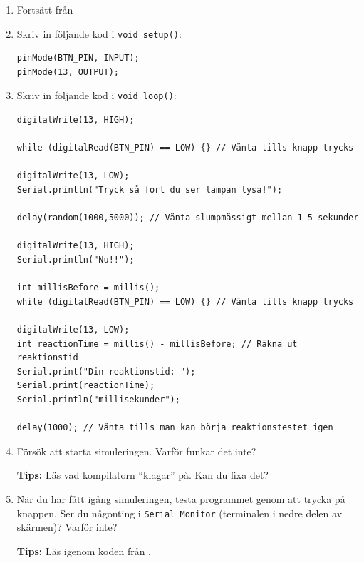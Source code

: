 \documentclass[11pt]{article}
\begin{document}
\begin{enumerate}
      \item
            Fortsätt från 
      \item Skriv in följande kod i \texttt{void setup()}:
            \begin{lstlisting}
pinMode(BTN_PIN, INPUT);
pinMode(13, OUTPUT);
            \end{lstlisting}
      \item Skriv in följande kod i \texttt{void loop()}:
            \begin{lstlisting}
digitalWrite(13, HIGH);

while (digitalRead(BTN_PIN) == LOW) {} // Vänta tills knapp trycks

digitalWrite(13, LOW);
Serial.println("Tryck så fort du ser lampan lysa!");

delay(random(1000,5000)); // Vänta slumpmässigt mellan 1-5 sekunder

digitalWrite(13, HIGH);
Serial.println("Nu!!");

int millisBefore = millis();
while (digitalRead(BTN_PIN) == LOW) {} // Vänta tills knapp trycks

digitalWrite(13, LOW);
int reactionTime = millis() - millisBefore; // Räkna ut reaktionstid
Serial.print("Din reaktionstid: ");
Serial.print(reactionTime);
Serial.println("millisekunder");

delay(1000); // Vänta tills man kan börja reaktionstestet igen
                  \end{lstlisting}
      \item Försök att starta simuleringen. Varför funkar det inte?

            \textbf{Tips: } Läs vad kompilatorn ``klagar'' på. Kan du fixa det?
      \item När du har fått igång simuleringen, testa programmet genom att
            trycka på knappen. Ser du någonting i \texttt{Serial Monitor}
            (terminalen i
            nedre delen av skärmen)? Varför inte?

            \textbf{Tips: } Läs igenom koden från
            .
\end{enumerate}
\end{document}
